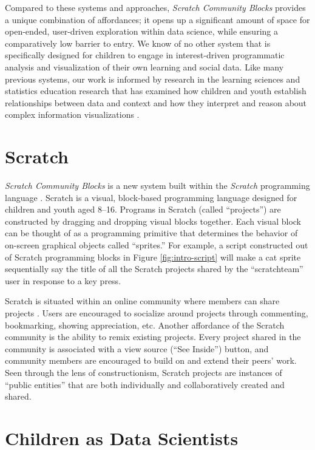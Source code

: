 \documentclass{sigchi}
\begin{document}
Compared to these systems and approaches, \emph{Scratch Community Blocks} provides a unique combination of affordances; it opens up a significant amount of space for open-ended, user-driven exploration within data science, while ensuring a comparatively low barrier to entry. We know of no other system that is specifically designed for children to engage in interest-driven programmatic analysis and visualization of their own learning and social data. Like many previous systems, our work is informed by research in the learning sciences and statistics education research that has examined how children and youth establish relationships between data and context \cite{ben-zvi_childrens_2016} and how they interpret and reason about complex information visualizations \cite{laina_distributions_2016}.

\section{Scratch} 

\emph{Scratch Community Blocks} is a new system built within the \emph{Scratch} programming language \cite{resnick_scratch:_2009}. Scratch is a visual, block-based programming language designed for children and youth aged 8--16. Programs in Scratch (called ``projects'') are constructed by dragging and dropping visual blocks together. Each visual block can be thought of as a programming primitive that determines the behavior of on-screen graphical objects called ``sprites.'' For example, a script constructed out of Scratch programming blocks in Figure \ref{fig:intro-script} will make a cat sprite sequentially say the title of all the Scratch projects shared by the ``scratchteam'' user in response to a key press.

Scratch is situated within an online community where members can share projects \cite{monroy_hernandez_scratchr:_2007}. Users are encouraged to socialize around projects through commenting, bookmarking, showing appreciation, etc. Another affordance of the Scratch community is the ability to remix existing projects. Every project shared in the community is associated with a view source (``See Inside'') button, and community members are encouraged to build on and extend their peers' work. Seen through the lens of constructionism, Scratch projects are instances of ``public entities'' that are both individually and collaboratively created and shared. 

\section{Children as Data Scientists}
\end{document}
